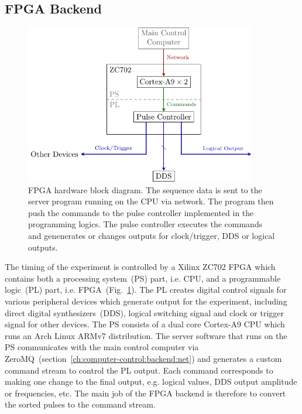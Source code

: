 \subsection{FPGA Backend}
\label{ch:computer-control:backend:fpga}
\begin{figure}
  \centering
  \includegraphics[width=0.9\textwidth]{figures/computer_control_backend_fpga.pdf}
  \caption[FPGA Block Diagram]{
    FPGA hardware block diagram.
    The sequence data is sent to the server program running on the CPU via network.
    The program then push the commands to the pulse controller implemented
    in the programming logics.
    The pulse controller executes the commands and genenerates or changes outputs
    for clock/trigger, DDS or logical outputs.
    \label{fig:computer-control:backend:fpga}}
\end{figure}
The timing of the experiment is controlled by a Xilinx ZC702 FPGA
which contains both a processing system~(PS) part, i.e. CPU,
and a programmable logic~(PL) part, i.e. FPGA~(Fig.~\ref{fig:computer-control:backend:fpga}).
The PL creates digital control signals for various peripheral devices
which generate output for the experiment,
including direct digital synthesizers~(DDS), logical switching signal
and clock or trigger signal for other devices.
The PS consists of a dual core Cortex-A9 CPU
which runs an Arch Linux ARMv7 distribution.
The server software that runs on the PS communicates with the main control computer
via ZeroMQ~(section~\ref{ch:computer-control:backend:net})
and generates a custom command stream to control the PL output.
Each command corresponds to making one change to the final output, e.g.
logical values, DDS output amplitude or frequencies, etc.
The main job of the FPGA backend is therefore to convert
the sorted pulses to the command stream.

